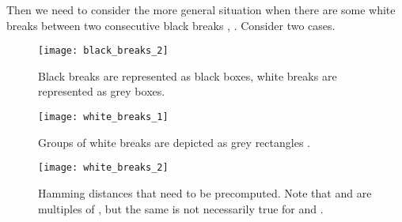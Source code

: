 \documentclass[runningheads]{llncs}
\begin{document}
Then we need to consider the more general situation when there are some white breaks between two consecutive black breaks , . Consider two cases.

\begin{figure}[t]
\texttt{[image: black\_breaks\_2]}
\caption{Black breaks are represented as black boxes, white breaks are represented as grey boxes.}
\label{figure:black_breaks_2}
\vspace{0.2cm}
\texttt{[image: white\_breaks\_1]}
\caption{Groups of white breaks are depicted as grey rectangles .}
\label{figure:white_breaks_1}
\vspace{0.2cm}
\texttt{[image: white\_breaks\_2]}
\caption{Hamming distances that need to be precomputed. Note that  and  are multiples of , but the same is not necessarily true for  and .}
\label{figure:white_breaks_2}
\end{figure}
\end{document}
